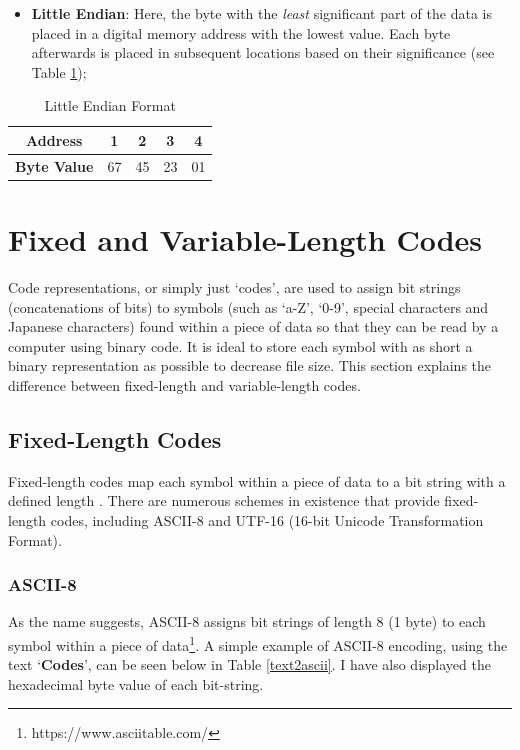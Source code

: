 \documentclass[12pt]{article}
\begin{document}
\begin{itemize}	
	\item \textbf{Little Endian}:  Here, the byte with the \emph{least} significant part of the data is placed in a digital memory address with the lowest value. Each byte afterwards is placed in subsequent locations based on their significance (see Table \ref{little_endian});
\end{itemize}
\begin{table}[H]
	\centering
	\begin{tabular}{| c | c | c | c | c |} 
		\hline
		\textbf{Address} & 1 & 2 & 3 & 4\\
		\hline
		\textbf{Byte Value} & 67 & 45 & 23 & 01\\
		\hline
	\end{tabular}
	\caption{Little Endian Format}
	\label{little_endian}
\end{table}

\clearpage
\section{Fixed and Variable-Length Codes}
Code representations, or simply just `codes', are used to assign bit strings (concatenations of bits) to symbols (such as `a-Z', `0-9', special characters and Japanese characters) found within a piece of data so that they can be read by a computer using binary code. It is ideal to store each symbol with as short a binary representation as possible to decrease file size. This section explains the difference between fixed-length and variable-length codes.

\subsection{Fixed-Length Codes}
Fixed-length codes map each symbol within a piece of data to a bit string with a defined length \citep[p.~5]{dc_complete_ref}. There are numerous schemes in existence that provide fixed-length codes, including ASCII-8 and UTF-16 (16-bit Unicode Transformation Format).

\subsubsection{ASCII-8}
As the name suggests, ASCII-8 assigns bit strings of length 8 (1 byte) to each symbol within a piece of data\footnote{https://www.asciitable.com/}. A simple example of ASCII-8 encoding, using the text `\textbf{Codes}', can be seen below in Table \ref{text2ascii}. I have also displayed the hexadecimal byte value of each bit-string.
\end{document}
